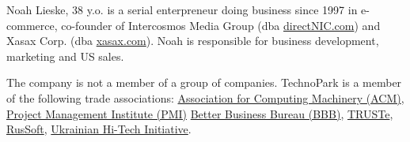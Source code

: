 Noah Lieske, 38 y.o.
is a serial enterpreneur doing business since 1997 in 
e-commerce, co-founder of Intercosmos Media Group (dba \href{http://www.directnic.com}{directNIC.com}) and 
Xasax Corp. (dba \href{http://www.xasax.com}{xasax.com}). Noah is responsible
for business development, marketing and US sales.

The company is not a member of a group of companies.
TechnoPark is a member of the following trade associations:
    \href{http://www.acm.org}{Association for Computing Machinery (ACM)},
    \href{http://www.pmi.org}{Project Management Institute (PMI)}
	\href{https://www.bbb.org/online/consumer/cks.aspx?ID=10805219819}{Better Business Bureau (BBB)},
	\href{http://www.truste.org/ivalidate.php?url=www.technoparkcorp.com&sealid=101}{TRUSTe},
	\href{http://www.russoft.org}{RusSoft},
	\href{http://hi-tech.org.ua/Russian/about/members/index.html}{Ukrainian Hi-Tech Initiative}.
